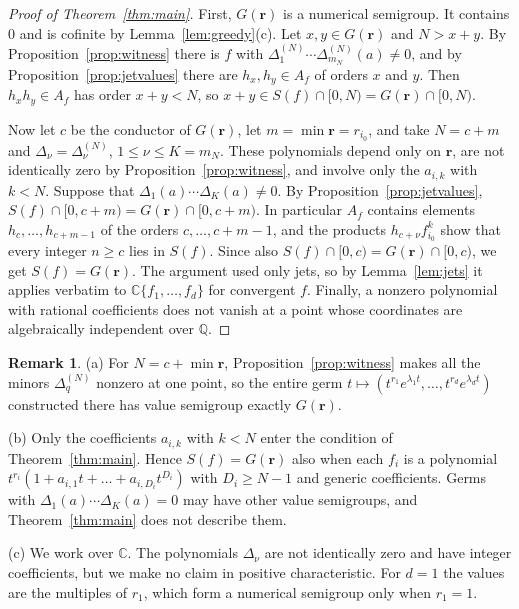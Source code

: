 \documentclass{amsart}
\theoremstyle{definition}
\newtheorem{remark}[theorem]{Remark}
\numberwithin{equation}{section}
\newcommand{\Q}{\mathbb{Q}}
\newcommand{\C}{\mathbb{C}}
\newcommand{\bfr}{\mathbf{r}}
\begin{document}
\begin{proof}[Proof of Theorem~\ref{thm:main}]
First, $G(\bfr)$ is a numerical semigroup. It contains $0$ and is cofinite by
Lemma~\ref{lem:greedy}(c). Let $x,y\in G(\bfr)$ and $N>x+y$. By
Proposition~\ref{prop:witness} there is $f$ with
$\Delta_1^{(N)}\cdots\Delta_{m_N}^{(N)}(a)\ne0$, and by
Proposition~\ref{prop:jetvalues} there are $h_x,h_y\in A_f$ of orders $x$ and
$y$. Then $h_xh_y\in A_f$ has order $x+y<N$, so $x+y\in S(f)\cap[0,N)
=G(\bfr)\cap[0,N)$.

Now let $c$ be the conductor of $G(\bfr)$, let $m=\min\bfr=r_{i_0}$, and take
$N=c+m$ and $\Delta_\nu=\Delta^{(N)}_\nu$, $1\le\nu\le K=m_N$. These polynomials
depend only on $\bfr$, are not identically zero by
Proposition~\ref{prop:witness}, and involve only the $a_{i,k}$ with $k<N$.
Suppose that $\Delta_1(a)\cdots\Delta_K(a)\ne0$.
By Proposition~\ref{prop:jetvalues}, $S(f)\cap[0,c+m)=G(\bfr)\cap[0,c+m)$. In
particular $A_f$ contains elements $h_c,\dots,h_{c+m-1}$ of the orders
$c,\dots,c+m-1$, and the products $h_{c+\nu}f_{i_0}^k$ show that every integer
$n\ge c$ lies in $S(f)$. Since also $S(f)\cap[0,c)=G(\bfr)\cap[0,c)$, we get
$S(f)=G(\bfr)$. The argument used only jets, so by Lemma~\ref{lem:jets} it
applies verbatim to $\C\{f_1,\dots,f_d\}$ for convergent $f$. Finally, a
nonzero polynomial with rational coefficients does not vanish at a point whose
coordinates are algebraically independent over $\Q$.
\end{proof}

\begin{remark}\label{rem:simultaneous}
(a) For $N=c+\min\bfr$, Proposition~\ref{prop:witness} makes all the minors
$\Delta^{(N)}_q$ nonzero at one point, so the entire germ
$t\mapsto(t^{r_1}e^{\lambda_1t},\dots,t^{r_d}e^{\lambda_dt})$ constructed there
has value semigroup exactly $G(\bfr)$.

(b) Only the coefficients $a_{i,k}$ with $k<N$ enter the condition of
Theorem~\ref{thm:main}. Hence $S(f)=G(\bfr)$ also when each $f_i$ is a
polynomial $t^{r_i}(1+a_{i,1}t+\dots+a_{i,D_i}t^{D_i})$ with $D_i\ge N-1$ and
generic coefficients. Germs with $\Delta_1(a)\cdots\Delta_K(a)=0$ may have other
value semigroups, and Theorem~\ref{thm:main} does not describe them.

(c) We work over $\C$. The polynomials $\Delta_\nu$ are not identically zero
and have integer coefficients, but we make no claim in positive characteristic.
For $d=1$ the values are the multiples of $r_1$, which form a numerical
semigroup only when $r_1=1$.
\end{remark}
\end{document}

